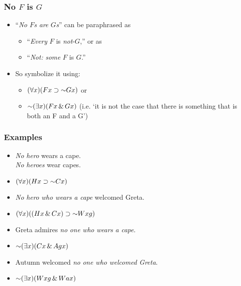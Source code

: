 \begin{frame}
\frametitle{No $F$ is $G$}

\begin{itemize}[<+->]
  \item ``\emph{No $F$s are $G$s}'' can be paraphrased as 
\begin{itemize}[<+->]
  \item ``\emph{Every} $F$ is \emph{not}-$G$,'' or as
  \item ``\emph{Not: some} $F$ is $G$.''
  \end{itemize}
\bigskip
  \item So symbolize it using:
\begin{itemize}
  \item \emph{$\qt{\forall}{x}(F\qv{x} \to \enot G\qv{x})$} or
  \item \emph{$\enot\qt{\exists}{x}(F\qv{x} \eand G\qv{x})$} (i.e. `it is not the case that there is something that is both an F and a G')
\end{itemize}
\end{itemize}

\end{frame}

\begin{frame}
\frametitle{Examples}

\begin{itemize}[<+->]
  \item \emph{No hero} wears a cape.\\
  \emph{No heroes} wear capes.\\
  \item[] \alert{$\qt{\forall}{x}(H\qv{x} \eif \enot C\qv{x})$}
  \item \emph{No hero who wears a cape} welcomed Greta.\\
  \item[] \alert{$\qt{\forall}{x}((H\qv{x} \eand C\qv{x}) \eif \enot W\qr{x}{g})$}
  \item Greta admires \emph{no one who wears a cape}.
  \item[] \alert{$\enot\qt{\exists}{x}(C\qv{x} \eand A\qr{g}{x})$}
  \item Autumn welcomed \emph{no one who welcomed Greta}.
  \item[] \alert{$\enot\qt{\exists}{x}(W\qr{x}{g} \eand W\qr{a}{x})$}
\end{itemize}
\end{frame}


